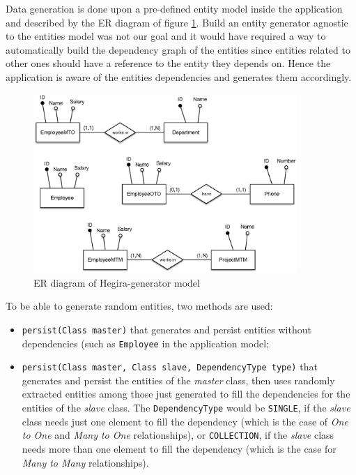 \newparagraph Data generation is done upon a pre-defined entity model inside the application and described by the ER diagram of figure \ref{fig:hegira-generator-er}.
Build an entity generator agnostic to the entities model was not our goal and it would have required a way to automatically build the dependency graph of the entities since entities related to other ones should have a reference to the entity they depends on. Hence the application is aware of the entities dependencies and generates them accordingly.

\begin{figure}[tbh]
  \centering
  \includegraphics[width=10cm]{images/hegira_generator_er}
  \caption{ER diagram of Hegira-generator model}
  \label{fig:hegira-generator-er}
\end{figure} 

\noindent To be able to generate random entities, two methods are used:
\begin{itemize}
\item \texttt{persist(Class master)} that generates and persist entities without dependencies (such as \texttt{Employee} in the application model;
\item \texttt{persist(Class master, Class slave, DependencyType type)} that generates and persist the entities of the \textit{master} class, then uses randomly extracted entities among those just generated to fill the dependencies for the entities of the \textit{slave} class.
The \texttt{DependencyType} would be \texttt{SINGLE}, if the \textit{slave} class needs just one element to fill the dependency (which is the case of \textit{One to One} and \textit{Many to One} relationships), or \texttt{COLLECTION}, if the \textit{slave} class needs more than one element to fill the dependency (which is the case for \textit{Many to Many} relationships).
\end{itemize}

